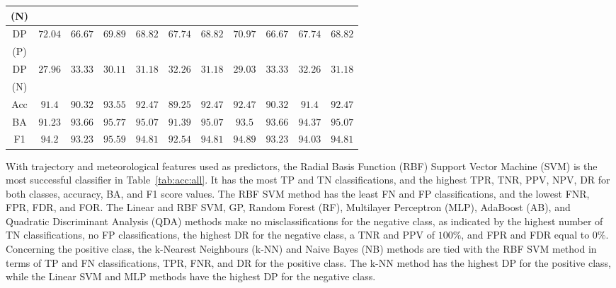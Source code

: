\let\LaTeXcline\cline\documentclass[sn-mathphys-num]{sn-jnl}\let\cline\LaTeXcline
\begin{document}
\begin{table}[!ht]
\begin{tabular}{|c|c|c|c|c|c|c|c|c|c|c|}
            (N) & & & & & & & & & & \\ \hline
            DP & \multirow{2}{*}{$\mathbf{72.04}$} & \multirow{2}{*}{$66.67$} & \multirow{2}{*}{$69.89$} & \multirow{2}{*}{$68.82$} & \multirow{2}{*}{$67.74$} & \multirow{2}{*}{$68.82$} & \multirow{2}{*}{$70.97$} & \multirow{2}{*}{$66.67$} & \multirow{2}{*}{$67.74$} & \multirow{2}{*}{$68.82$} \\
            (P) & & & & & & & & & & \\ \hline
            DP & \multirow{2}{*}{$27.96$} & \multirow{2}{*}{$\mathbf{33.33}$} & \multirow{2}{*}{$30.11$} & \multirow{2}{*}{$31.18$} & \multirow{2}{*}{$32.26$} & \multirow{2}{*}{$31.18$} & \multirow{2}{*}{$29.03$} & \multirow{2}{*}{$\mathbf{33.33}$} & \multirow{2}{*}{$32.26$} & \multirow{2}{*}{$31.18$} \\     
            (N) & & & & & & & & & & \\ \hline
            Acc & $91.4$ & $90.32$ & $\mathbf{93.55}$ & $92.47$ & $89.25$ & $92.47$ & $92.47$ & $90.32$ & $91.4$ & $92.47$ \\ \hline
            BA & $91.23$ & $93.66$ & $\mathbf{95.77}$ & $95.07$ & $91.39$ & $95.07$ & $93.5$ & $93.66$ & $94.37$ & $95.07$ \\ \hline
            F1 & $94.2$ & $93.23$ & $\mathbf{95.59}$ & $94.81$ & $92.54$ & $94.81$ & $94.89$ & $93.23$ & $94.03$ & $94.81$ \\ \hline
    	\end{tabular}
\end{table}

With trajectory and meteorological features used as predictors, the Radial Basis Function (RBF) Support Vector Machine (SVM) is the most successful classifier in Table~\ref{tab:acc:all}. It has the most TP and TN classifications, and the highest TPR, TNR, PPV, NPV, DR for both classes, accuracy, BA, and F1 score values. The RBF SVM method has the least FN and FP classifications, and the lowest FNR, FPR, FDR, and FOR. The Linear and RBF SVM, GP, Random Forest (RF), Multilayer Perceptron (MLP), AdaBoost (AB), and Quadratic Discriminant Analysis (QDA) methods make no misclassifications for the negative class, as indicated by the highest number of TN classifications, no FP classifications, the highest DR for the negative class, a TNR and PPV of $100\%$, and FPR and FDR equal to $0\%$. Concerning the positive class, the k-Nearest Neighbours (k-NN) and Naive Bayes (NB) methods are tied with the RBF SVM method in terms of TP and FN classifications, TPR, FNR, and DR for the positive class. The k-NN method has the highest DP for the positive class, while the Linear SVM and MLP methods have the highest DP for the negative class.
        
\end{document}
